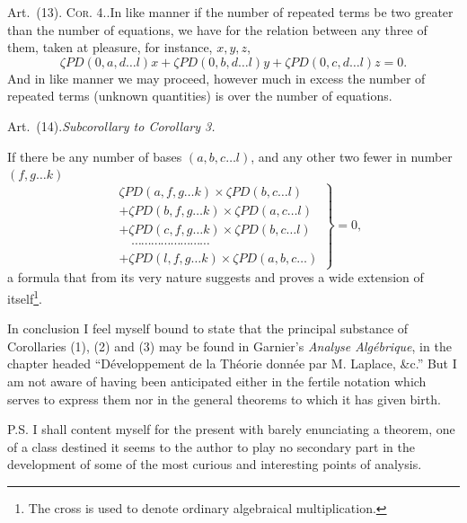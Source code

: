 \documentclass[11pt]{article}
\newcommand{\corhead}[1]{\textsc{Cor. #1.}}
\newcommand{\art}[1]{\par\smallskip\noindent Art.~(#1).\quad}
\newcommand{\PD}{\mathit{PD}}
\begin{document}
\art{13} \corhead{4.}\quad In like manner if the number of repeated terms be two greater than the number of equations, we have for the relation between any three of them, taken at pleasure, for instance, $x,y,z$,
\[
 \zeta\PD(0,a,d\ldots l)x+\zeta\PD(0,b,d\ldots l)y+\zeta\PD(0,c,d\ldots l)z=0.
\]
And in like manner we may proceed, however much in excess the number of repeated terms (unknown quantities) is over the number of equations.

\begin{center}Art.~(14).\quad \itshape Subcorollary to Corollary 3.\end{center}

If there be any number of bases $(a,b,c\ldots l)$, and any other two fewer in number $(f,g\ldots k)$
\[
\left.
\begin{aligned}
&\zeta\PD(a,f,g\ldots k)\times\zeta\PD(b,c\ldots l)\\
&+\zeta\PD(b,f,g\ldots k)\times\zeta\PD(a,c\ldots l)\\
&+\zeta\PD(c,f,g\ldots k)\times\zeta\PD(b,c\ldots l)\\
&\quad\cdots\cdots\cdots\cdots\cdots\cdots\cdots\cdots\\
&+\zeta\PD(l,f,g\ldots k)\times\zeta\PD(a,b,c\ldots)
\end{aligned}
\right\}=0,
\]
a formula that from its very nature suggests and proves a wide extension of itself\footnote{The cross is used to denote ordinary algebraical multiplication.}.

In conclusion I feel myself bound to state that the principal substance of Corollaries (1), (2) and (3) may be found in Garnier's \emph{Analyse Alg\'ebrique}, in the chapter headed ``D\'eveloppement de la Th\'eorie donn\'ee par M. Laplace, \&c.'' But I am not aware of having been anticipated either in the fertile notation which serves to express them nor in the general theorems to which it has given birth.

P.S. I shall content myself for the present with barely enunciating a theorem, one of a class destined it seems to the author to play no secondary part in the development of some of the most curious and interesting points of analysis.
\end{document}
